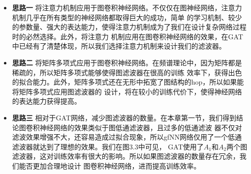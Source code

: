 \begin{itemize}
    \item \textbf{思路一} \quad
    将注意力机制应用于图卷积神经网络。不仅仅在图神经网络，注意力机制几乎在所有类型的神经网络都取得巨大的成功，简单
    的学习机制、较少的参数量、强大的表达能力，使得注意力机制成为了我们在设计复杂网络过程时的必然选择。此外，将注意力
    机制应用在图卷积神经网络的效果，在GAT中已经有了清楚体现，所以我们选择注意力机制来设计我们的滤波器。
    
    \item \textbf{思路二} \quad
    将矩阵多项式应用于图卷积神经网络。在频谱理论中，因为矩阵都是稀疏的，所以矩阵多项式能够使得图滤波器在很高的训练
    效率下，获得出色的拟合能力。此外，矩阵多项式还在无形中拓宽了图结构的hop，所以如果能将矩阵多项式应用图滤波器的
    设计，将在较小的训练代价下，使得神经网络的表达能力获得提高。

    \item \textbf{思路三} \quad
    相对于GAT网络，减少图滤波器的数量。在本章第一节，我们得到结论图卷积神经网络的效果类似于图低通滤波器，且过多的低通滤波
    器不仅对滤波效果增强不大，还容易造成过拟合现象，所以gfNN网络仅用了一个低通滤波器就达到了理想的效果。我们在图3.3中可见，
    GAT使用了$A_{1}$和$A_{2}$两个图滤波器，这对训练效率有很大的影响。所以如果图滤波器的数量存在冗余，我们能否更加合理地设计
    图卷积神经网络，进而提高训练效率。

\end{itemize}


